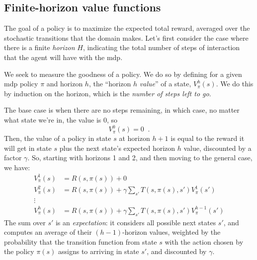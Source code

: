 
\subsection{Finite-horizon value functions}
\label{sec-mdp_finite_horizon}

The goal of a policy is to maximize the expected total reward, averaged over
the stochastic transitions that the domain makes.  Let's first
consider the case where there is a finite {\em horizon} $H$,
indicating the total number of steps of interaction that the agent
will have with the {\sc mdp}.

We seek to measure the goodness of a
policy. We do so by defining for a given {\sc mdp} policy $\pi$ and horizon
$h$, the ``horizon $h$ {\em value}'' of a state, $V^{h}_\pi(s)$.  We
do this by induction on the horizon, which is the {\em number of steps
    left to go}.

The base case is when there are no steps remaining, in which case, no
matter what state we're in, the value is 0,  so
\begin{equation}
  V^0_{\pi}(s) = 0\;\;.
  \label{eq:finite_val_0}
\end{equation}
Then, the value of a policy in state $s$ at horizon $h + 1$ is equal
to the reward it will get in state $s$ plus the next state's expected horizon $h$
value, discounted by a factor $\gamma$.  So, starting with horizons 1 and 2, and then
moving to the general case, we have:
\begin{align}
  V^1_{\pi}(s) & = R(s, \pi(s)) + 0                                                     \\
  \label{eq:finite_val_1}
  V^2_{\pi}(s) & = R(s, \pi(s)) +  \gamma \sum_{s'}T(s, \pi(s), s')  V^1_{\pi}(s')      \\
  \vdots
  \nonumber                                                                             \\
  V^h_{\pi}(s) & = R(s, \pi(s)) + \gamma \sum_{s'}T(s, \pi(s), s')  V^{h - 1}_{\pi}(s')
  \label{eq:finite_value}
\end{align}
The sum over $s'$ is an {\em expectation}: it
considers all possible next states $s'$, and computes an average of
their $(h-1)$-horizon values, weighted by the probability that the
transition function from state $s$ with the action chosen by the
policy $\pi(s)$ assigns to arriving in state $s'$, and discounted by $\gamma$.

